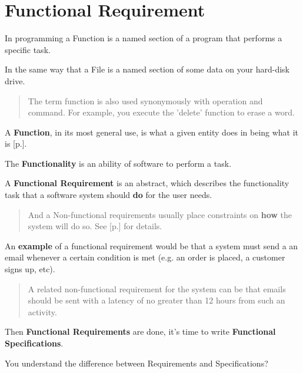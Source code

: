 \section{Functional Requirement}
\label{sec:Functional Requirement}

In programming a Function is a named section of a program that performs a specific task.

In the same way that a File is a named section of some data on your hard-disk drive.

\begin{quote}
The term function is also used synonymously with operation and command. For example, you execute the 'delete' function to erase a word.
\end{quote} 

A \textbf{Function}, in its most general use, is what a given entity does in being what it is [p.\pageref{sec:Function}].

The \textbf{Functionality} is an ability of software to perform a task.

A \textbf{Functional Requirement} is an abstract, which describes the functionality task that a software system should \textbf{do} for the user needs.

\begin{quote}
And a Non-functional requirements usually place constraints on \textbf{how} the system will do so. See [p.\pageref{sec:Non-functional Requirement}] for details.                                                                                        \end{quote} 

An \textbf{example} of a functional requirement would be that a system must send a an email whenever a certain condition is met (e.g. an order is placed, a customer signs up, etc).

\begin{quote}
A related non-functional requirement for the system can be that emails should be sent with a latency of no greater than 12 hours from such an activity.
\end{quote} 

Then \textbf{Functional Requirements} are done, it's time to write \textbf{Functional Specifications}.

You understand the difference between Requirements and Specifications?
